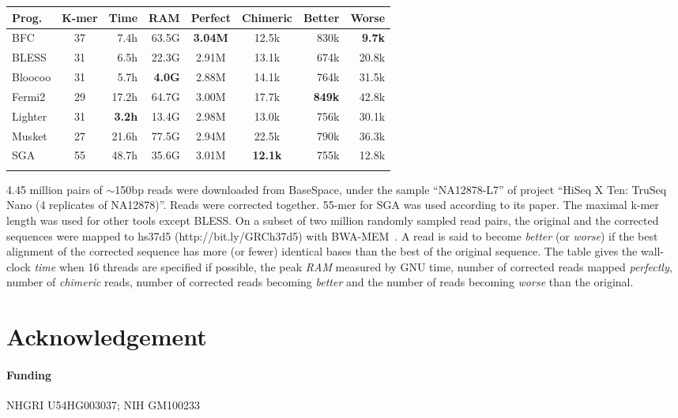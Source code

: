 \documentclass{bioinfo}
\begin{document}
\begin{table}[ht]
{\footnotesize
\begin{tabular}{lcrrccrr}
\toprule
Prog.     & K-mer & Time & RAM   & Perfect & Chimeric & Better & Worse \\
\midrule
BFC       & 37    & 7.4h & 63.5G &{\bf 3.04M}& 12.5k  & 830k   &{\bf 9.7k} \\
BLESS     & 31    & 6.5h & 22.3G & 2.91M   & 13.1k    & 674k   & 20.8k  \\
Bloocoo   & 31    &5.7h&{\bf 4.0G}& 2.88M  & 14.1k    & 764k   & 31.5k  \\
Fermi2    & 29    &17.2h & 64.7G & 3.00M   & 17.7k    &{\bf 849k}&42.8k \\
Lighter   & 31    &{\bf 3.2h}& 13.4G&2.98M & 13.0k    & 756k   & 30.1k  \\
Musket    & 27    &21.6h & 77.5G & 2.94M   & 22.5k    & 790k   & 36.3k  \\
SGA       & 55    &48.7h & 35.6G & 3.01M  &{\bf 12.1k}& 755k   & 12.8k  \\
\botrule
\end{tabular}}{4.45 million pairs of $\sim$150bp reads were
downloaded from BaseSpace, under the sample ``NA12878-L7'' of project
``HiSeq X Ten: TruSeq Nano (4 replicates of NA12878)''. Reads were corrected
together. 55-mer for SGA was used according to its paper. The maximal k-mer
length was used for other tools except BLESS. On a subset of two million
randomly sampled read pairs, the original and the corrected sequences were
mapped to hs37d5 (http://bit.ly/GRCh37d5) with BWA-MEM~\citep{Li:2013aa}. A
read is said to become \emph{better} (or \emph{worse}) if the best alignment of
the corrected sequence has more (or fewer) identical bases than the best of the
original sequence. The table gives the wall-clock \emph{time} when 16 threads
are specified if possible, the peak \emph{RAM} measured by GNU time, number of
corrected reads mapped \emph{perfectly}, number of \emph{chimeric} reads,
number of corrected reads becoming \emph{better} and the number of reads
becoming \emph{worse} than the original.}

\end{table}

\section*{Acknowledgement}
\paragraph{Funding\textcolon} NHGRI U54HG003037; NIH GM100233


\end{document}
